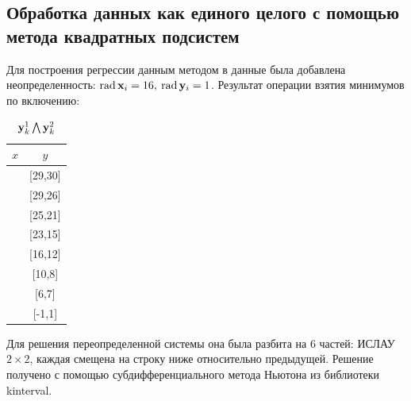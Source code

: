\documentclass[a4paper]{article}
\begin{document}
\subsection{Обработка данных как единого целого с помощью метода квадратных подсистем}
Для построения регрессии данным методом в данные была добавлена неопределенность: $\operatorname{rad}\mathbf{x}_i=16,\:\operatorname{rad}\mathbf{y}_i=1$. Результат операции взятия минимумов по включению:
\begin{table}[H]
    \centering
    \begin{tabular}{|c|c|}
        \hline
         $x$&$y$  \\
         \hline
         [-16,16]&[29,30]\\
         \hline
         [48,80]&[29,26]\\
         \hline
         [112,144]&[25,21]\\
         \hline
         [176,208]&[23,15]\\
         \hline
         [240,272]&[16,12]\\
         \hline
         [304,336]&[10,8]\\
         \hline
         [368,400]&[6,7]\\
         \hline
         [432,464]&[-1,1]\\
         \hline
    \end{tabular}
    \caption{$\mathbf{y}_k^1\bigwedge\mathbf{y}_k^2$}
    \label{tab:kint}
\end{table}
Для решения переопределенной системы она была разбита на 6 частей: ИСЛАУ $2\times2$, каждая смещена на строку ниже относительно предыдущей. Решение получено с помощью субдифференциального метода Ньютона из библиотеки kinterval. 
\end{document}
